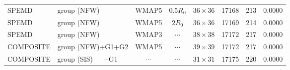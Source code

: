 \documentclass[useAMS,usenatbib]{mnras}
\def\nomicro{$\cdots$}
\def\nodata{$\cdots$}
\begin{document}
\begin{table}
\begin{tabular}{llccccrr}
        SPEMD     & group (NFW)       &WMAP5 & $0.5R_{0}$&$36\times36$ & 17168 & 213 & 0.0000\\
        SPEMD     & group (NFW)       &WMAP5 & $2R_{0}$&$36\times36$ & 17169 & 214 & 0.0000\\
        SPEMD     & group (NFW)       &WMAP3 & \nomicro&$38\times38$ & 17172 & 217 & 0.0000\\
        COMPOSITE & group (NFW)+G1+G2 &WMAP5 & \nomicro&$39\times39$ & 17172 & 217 & 0.0000\\
        COMPOSITE & group (SIS)~~~+G1 &\nodata& \nomicro&$31\times31$ & 17175 & 220 & 0.0000\\
        
        

\end{tabular}
\end{table}
\end{document}
